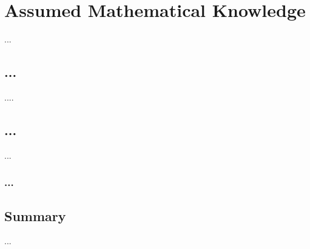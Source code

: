\chapter{Assumed Mathematical Knowledge}
\label{ch:lit_rev}

...
\section{...}
....


\section{...}
...


\subsection{...}


\section{Summary}
...


